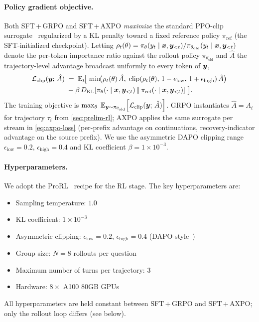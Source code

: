 \paragraph{Policy gradient objective.}
\label{app:clip-objective}
Both SFT\,+\,GRPO and SFT\,+\,AXPO \emph{maximize} the standard PPO-clip surrogate~\citep{PPO} regularized by a KL penalty toward a fixed reference policy $\pi_{\text{ref}}$ (the SFT-initialized checkpoint). Letting $\rho_t(\theta) = \pi_\theta(y_t \mid {\bm{x}}, {\bm{y}}_{<t}) / \pi_{\theta_{\text{old}}}(y_t \mid {\bm{x}}, {\bm{y}}_{<t})$ denote the per-token importance ratio against the rollout policy $\pi_{\theta_{\text{old}}}$ and $\hat{A}$ the trajectory-level advantage broadcast uniformly to every token of ${\bm{y}}$,
\begin{gather}
\label{eq:clip-app}
    \mathcal{L}_{\text{clip}}({\bm{y}};\, \hat{A}) \;=\; \mathbb{E}_{t}\!\big[\, \min\!\bigl(\rho_t(\theta)\, \hat{A},\; \mathrm{clip}(\rho_t(\theta),\, 1-\epsilon_{\text{low}},\, 1+\epsilon_{\text{high}})\, \hat{A}\bigr) \\
    \;-\; \beta\, D_{\mathrm{KL}}\!\left[\pi_\theta(\cdot \mid {\bm{x}}, {\bm{y}}_{<t}) \,\Vert\, \pi_{\text{ref}}(\cdot \mid {\bm{x}}, {\bm{y}}_{<t})\right] \,\big]. \nonumber
\end{gather}
The training objective is $\max_\theta\; \mathbb{E}_{{\bm{y}} \sim \pi_{\theta_{\text{old}}}}\!\left[\mathcal{L}_{\text{clip}}({\bm{y}};\, \hat{A})\right]$. GRPO instantiates $\hat{A} = A_i$ for trajectory $\tau_i$ from \autoref{sec:prelim-rl}; AXPO applies the same surrogate per stream in \autoref{eq:axpo-loss} (per-prefix advantage on continuations, recovery-indicator advantage on the source prefix). We use the asymmetric DAPO clipping range $\epsilon_{\text{low}} = 0.2,\, \epsilon_{\text{high}} = 0.4$ and KL coefficient $\beta = 1\times 10^{-3}$.

\paragraph{Hyperparameters.}
We adopt the ProRL~\citep{prorl} recipe for the RL stage. The key hyperparameters are:
\begin{itemize}[leftmargin=*, itemsep=2pt]
    \item Sampling temperature: $1.0$
    \item KL coefficient: $1\times 10^{-3}$
    \item Asymmetric clipping: $\epsilon_{\text{low}} = 0.2$, $\epsilon_{\text{high}} = 0.4$ (DAPO-style~\citep{DAPO})
    \item Group size: $N = 8$ rollouts per question
    \item Maximum number of turns per trajectory: $3$
    \item Hardware: $8 \times$ A100 80GB GPUs
\end{itemize}
All hyperparameters are held constant between SFT\,+\,GRPO and SFT\,+\,AXPO; only the rollout loop differs (see below).


